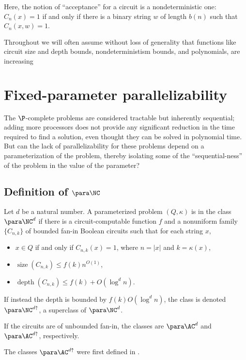 \documentclass{article}
\DeclareMathOperator{\depth}{depth}
\DeclareMathOperator{\size}{size}
\begin{document}
Here, the notion of ``acceptance'' for a circuit is a nondeterministic one: $C_n(x) = 1$ if and only if there is a binary string $w$ of length $b(n)$ such that $C_n(x, w) = 1$.

Throughout we will often assume without loss of generality that functions like circuit size and depth bounds, nondeterministism bounds, and polynomials, are increasing

\section{Fixed-parameter parallelizability}
\label{sec:pcompletefpp}

The $\P$-complete problems are considered tractable but inherently sequential; adding more processors does not provide any significant reduction in the time required to find a solution, even thought they can be solved in polynomial time.
But can the lack of parallelizability for these problems depend on a parameterization of the problem, thereby isolating some of the ``sequential-ness'' of the problem in the value of the parameter?

\subsection{Definition of \texorpdfstring{$\para \NC$}{paraNC}}

\begin{definition}[$\para \NC^d$]
  Let $d$ be a natural number.
  A parameterized problem $(Q, \kappa)$ is in the class $\para \NC^d$ if there is a circuit-computable function $f$ and a nonuniform family $\{C_{n, k}\}$ of bounded fan-in Boolean circuits such that for each string $x$,
  \begin{itemize}
  \item $x \in Q$ if and only if $C_{n, k}(x) = 1$, where $n = |x|$ and $k = \kappa(x)$,
  \item $\size(C_{n, k}) \leq f(k) n^{O(1)}$,
  \item $\depth(C_{n, k}) \leq f(k) + O(\log^d n)$.
  \end{itemize}
  If instead the depth is bounded by $f(k) O(\log^d n)$, the class is denoted $\para \NC^{d \uparrow}$, a superclass of $\para \NC^d$.

  If the circuits are of unbounded fan-in, the classes are $\para \AC^d$ and $\para \AC^{d \uparrow}$, respectively.
\end{definition}

The classes $\para \AC^{d \uparrow}$ were first defined in \autocite{bst15}.
\end{document}
